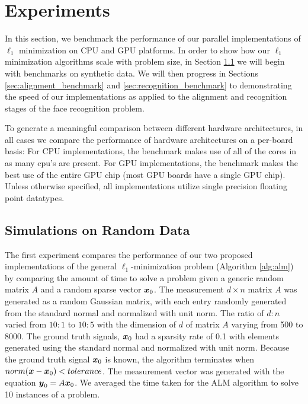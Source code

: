 \documentclass[10pt,twocolumn,letterpaper]{article}
\begin{document}
\section{Experiments}

In this section, we benchmark the performance of our parallel implementations
of $\ell_1$ minimization on CPU and GPU platforms.  In order to show how our
$\ell_1$ minimization algorithms scale with problem size, in Section
\ref{sec:simulation} we will begin with benchmarks on synthetic data.  We will
then progress in Sections \ref{sec:alignment_benchmark} and
\ref{sec:recognition_benchmark} to demonstrating the speed of our
implementations as applied to the alignment and recognition stages of the face
recognition problem.

To generate a meaningful comparison between different hardware architectures,
in all cases we compare the performance of hardware architectures on a
per-board basis:  For CPU implementations, the benchmark makes use of all of
the cores in as many cpu's are present.  For GPU implementations, the benchmark
makes the best use of the entire GPU chip (most GPU boards have a single GPU
chip).  Unless otherwise specified, all implementations utilize single
precision floating point datatypes.  

\subsection{Simulations on Random Data}
\label{sec:simulation}

The first experiment compares the performance of our two proposed implementations of 
the general $\ell_1$-minimization problem (Algorithm \eqref{alg:alm}) by
comparing the amount of time to solve a problem given a generic random matrix $A$ and a random sparse
vector ${\boldsymbol{x}}_0$.  
The measurement $d \times n$ matrix $A$ was generated as a random Gaussian matrix, with each entry
randomly generated from the standard normal and normalized with unit norm.  The ratio of $d:n$ varied from
$10:1$ to $10:5$ with the dimension of $d$ of matrix $A$ varying from 500 to 8000.
The ground truth signals, ${\boldsymbol{x}}_0$ had a sparsity rate of 0.1 with elements generated using the standard normal and normalized with unit norm.
Because the ground truth signal ${\boldsymbol{x}}_0$ is known, the algorithm terminates
when $norm({\boldsymbol x}-{\boldsymbol x}_0) < tolerance$.
The measurement vector was generated with the equation $\boldsymbol{y}_0 = A {\boldsymbol{x}}_0$.   
We averaged the time taken for the ALM algorithm to solve 10 instances of a problem.  
\end{document}
